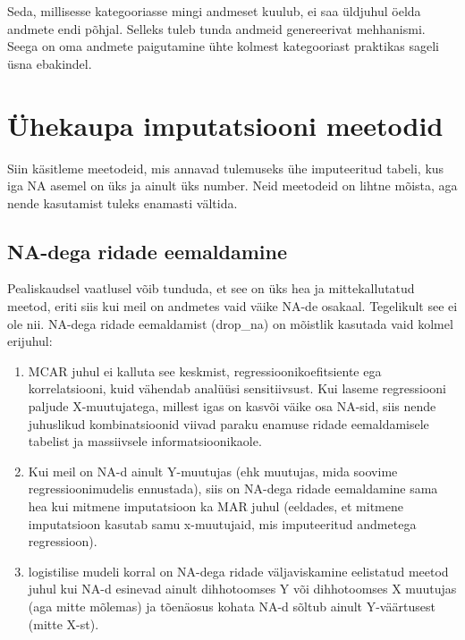 \documentclass[]{book}
\begin{document}
Seda, millisesse kategooriasse mingi andmeset kuulub, ei saa üldjuhul öelda andmete endi põhjal. Selleks tuleb tunda andmeid genereerivat mehhanismi. Seega on oma andmete paigutamine ühte kolmest kategooriast praktikas sageli üsna ebakindel.

\hypertarget{uhekaupa-imputatsiooni-meetodid}{%
\section{Ühekaupa imputatsiooni meetodid}\label{uhekaupa-imputatsiooni-meetodid}}

Siin käsitleme meetodeid, mis annavad tulemuseks ühe imputeeritud tabeli, kus iga NA asemel on üks ja ainult üks number. Neid meetodeid on lihtne mõista, aga nende kasutamist tuleks enamasti vältida.

\hypertarget{na-dega-ridade-eemaldamine}{%
\subsection{NA-dega ridade eemaldamine}\label{na-dega-ridade-eemaldamine}}

Pealiskaudsel vaatlusel võib tunduda, et see on üks hea ja mittekallutatud meetod, eriti siis kui meil on andmetes vaid väike NA-de osakaal. Tegelikult see ei ole nii.
NA-dega ridade eemaldamist (drop\_na) on mõistlik kasutada vaid kolmel erijuhul:

\begin{enumerate}
\def\labelenumi{\arabic{enumi}.}
\item
  MCAR juhul ei kalluta see keskmist, regressioonikoefitsiente ega korrelatsiooni, kuid vähendab analüüsi sensitiivsust. Kui laseme regressiooni paljude X-muutujatega, millest igas on kasvõi väike osa NA-sid, siis nende juhuslikud kombinatsioonid viivad paraku enamuse ridade eemaldamisele tabelist ja massiivsele informatsioonikaole.
\item
  Kui meil on NA-d ainult Y-muutujas (ehk muutujas, mida soovime regressioonimudelis ennustada), siis on NA-dega ridade eemaldamine sama hea kui mitmene imputatsioon ka MAR juhul (eeldades, et mitmene imputatsioon kasutab samu x-muutujaid, mis imputeeritud andmetega regressioon).
\item
  logistilise mudeli korral on NA-dega ridade väljaviskamine eelistatud meetod juhul kui NA-d esinevad ainult dihhotoomses Y või dihhotoomses X muutujas (aga mitte mõlemas) ja tõenäosus kohata NA-d sõltub ainult Y-väärtusest (mitte X-st).
\end{enumerate}
\end{document}
